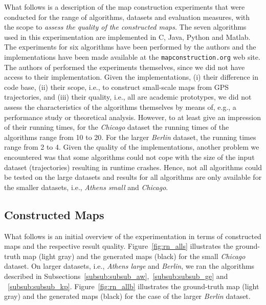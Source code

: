 \documentclass[natbib]{svjour3}                    \smartqed  \usepackage[table]{xcolor}
\begin{document}
What follows is a description of the map construction experiments that were conducted for the range of algorithms, datasets and evaluation measures, with the scope to \emph{assess the quality of the constructed maps}. 
The seven algorithms used in this experimentation are implemented in C, Java, Python and Matlab. The experiments for six algorithms have been performed by the authors and the implementations have been made available at the {\tt mapconstruction.org} web site. The authors of \cite{DBLP:conf/nips/GeSBW11} performed the experiments themselves, since we did not have access to their implementation. 
Given the implementations, (i) their difference in code base, (ii) their scope, i.e., to construct small-scale maps from GPS trajectories, and (iii) their quality, i.e., all are academic prototypes, we did not assess the characteristics of the algorithms themselves by means of, e.g., a performance study or theoretical analysis. However, to at least give an impression of their running times, for the \emph{Chicago} dataset the running times of the algorithms range from 10 to 20. For the larger \emph{Berlin} dataset, the running times range from 2 to 4.
Given the quality of the implementations, another problem we encountered was that some algorithms could not cope with the size of the input dataset (trajectories) resulting in runtime crashes. Hence, not all algorithms could be tested on the large datasets 
and results for all algorithms are only available for the smaller datasets, i.e., \emph{Athens small} and \emph{Chicago}.

\subsection{Constructed Maps}
\label{sub:constructed_maps}

What follows is an initial overview of the experimentation in terms of constructed maps and the respective result quality.
Figure~\ref{fig:rn_alls} illustrates the ground-truth map (light gray) and the generated maps (black) for the small \emph{Chicago} dataset. On larger datasets, i.e., \emph{Athens large} and \emph{Berlin}, we ran the algorithms described in Subsections~\ref{subsub:subsub_aw},~\ref{subsub:subsub_ge} and ~\ref{subsub:subsub_kp}. Figure~\ref{fig:rn_allb} illustrates the ground-truth map (light gray) and the generated maps (black) for the case of the larger \emph{Berlin} dataset.
\end{document}
